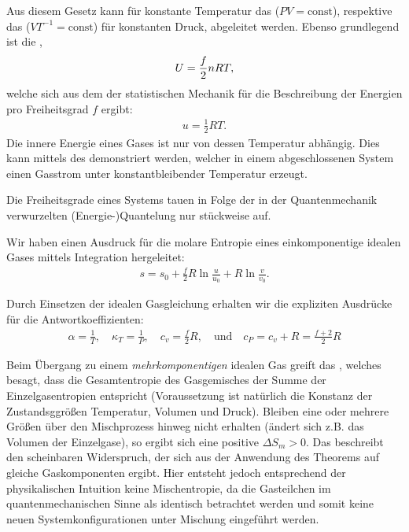 \begin{summary}
    Aus diesem Gesetz kann für konstante Temperatur das  ($PV=\text{const}$), respektive das  ($VT^{-1}=\text{const}$) für konstanten Druck, abgeleitet werden.
    Ebenso grundlegend ist die ,
    \begin{align*}
        U=\frac{f}{2}n RT,
    \end{align*}
    welche sich aus dem  der statistischen Mechanik für die Beschreibung der Energien pro Freiheitsgrad $f$ ergibt:
    \begin{align*}
        u=\frac{1}{2}RT.
    \end{align*}
    Die innere Energie eines Gases ist nur von dessen Temperatur abhängig. Dies kann mittels des  demonstriert werden, welcher in einem abgeschlossenen System einen Gasstrom unter konstantbleibender Temperatur erzeugt.
    
    Die Freiheitsgrade eines Systems tauen in Folge der in der Quantenmechanik verwurzelten (Energie-)Quantelung nur stückweise auf.

    Wir haben einen Ausdruck für die molare Entropie eines einkomponentige idealen Gases mittels Integration hergeleitet:
    \begin{align*}
        s=s_0+\frac{f}{2}R\ln\frac{u}{u_0}+R\ln\frac{v}{v_0}.
    \end{align*}

    Durch Einsetzen der idealen Gasgleichung erhalten wir die expliziten Ausdrücke für die Antwortkoeffizienten:
    \begin{align*}
        \alpha=\frac{1}{T}, \quad \kappa_T=\frac{1}{P}, \quad c_v=\frac{f}{2}R, \quad\mathrm{und}\quad c_P=c_v+R=\frac{f+2}{2}R
    \end{align*}

    Beim Übergang zu einem \emph{mehrkomponentigen} idealen Gas greift das , welches besagt, dass die Gesamtentropie des Gasgemisches der Summe der Einzelgasentropien entspricht (Voraussetzung ist natürlich die Konstanz der Zustandsggrößen Temperatur, Volumen und Druck). Bleiben eine oder mehrere Größen über den Mischprozess hinweg nicht erhalten (ändert sich z.B. das Volumen der Einzelgase), so ergibt sich eine positive  $\Delta S_m>0$. Das  beschreibt den scheinbaren Widerspruch, der sich aus der Anwendung des Theorems auf gleiche Gaskomponenten ergibt. Hier entsteht jedoch \textendash{} entsprechend der physikalischen Intuition \textendash{} keine Mischentropie, da die Gasteilchen im quantenmechanischen Sinne als identisch betrachtet werden und somit keine neuen Systemkonfigurationen unter Mischung eingeführt werden.
    

\end{summary}
